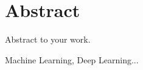 \chapter*{Abstract}

Abstract to your work. \cite{bar}

\begin{keywords}
	Machine Learning, Deep Learning...
\end{keywords}


